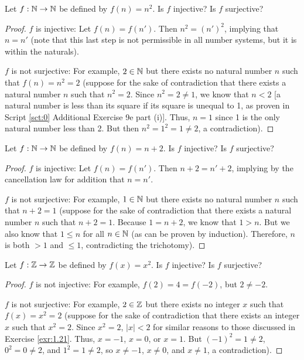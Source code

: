 \documentclass[../main.tex]{subfiles}
\begin{document}
\begin{exercise}\label{exr:1.21}
    Let $f:\mathbb{N}\to\mathbb{N}$ be defined by $f(n)=n^2$. Is $f$ injective? Is $f$ surjective?
    \begin{proof}
        $f$ is injective: Let $f(n)=f(n')$. Then $n^2=(n')^2$, implying that $n=n'$ (note that this last step is not permissible in all number systems, but it is within the naturals).\par
        $f$ is not surjective: For example, $2\in\mathbb{N}$ but there exists no natural number $n$ such that $f(n)=n^2=2$ (suppose for the sake of contradiction that there exists a natural number $n$ such that $n^2=2$. Since $n^2=2\neq 1$, we know that $n<2$ [a natural number is less than its square if its square is unequal to 1, as proven in Script \ref{sct:0} Additional Exercise 9e part (i)]. Thus, $n=1$ since 1 is the only natural number less than 2. But then $n^2=1^2=1\neq 2$, a contradiction).
    \end{proof}
\end{exercise}

\begin{exercise}\label{exr:1.22}
    Let $f:\mathbb{N}\to\mathbb{N}$ be defined by $f(n)=n+2$. Is $f$ injective? Is $f$ surjective?
    \begin{proof}
        $f$ is injective: Let $f(n)=f(n')$. Then $n+2=n'+2$, implying by the cancellation law for addition that $n=n'$.\par
        $f$ is not surjective: For example, $1\in\mathbb{N}$ but there exists no natural number $n$ such that $n+2=1$ (suppose for the sake of contradiction that there exists a natural number $n$ such that $n+2=1$. Because $1=n+2$, we know that $1>n$. But we also know that $1\leq n$ for all $n\in\mathbb{N}$ (as can be proven by induction). Therefore, $n$ is both $>1$ and $\leq 1$, contradicting the trichotomy).
    \end{proof}
\end{exercise}

\begin{exercise}\label{exr:1.23}
    Let $f:\mathbb{Z}\to\mathbb{Z}$ be defined by $f(x)=x^2$. Is $f$ injective? Is $f$ surjective?
    \begin{proof}
        $f$ is not injective: For example, $f(2)=4=f(-2)$, but $2\neq -2$.\par
        $f$ is not surjective: For example, $2\in\mathbb{Z}$ but there exists no integer $x$ such that $f(x)=x^2=2$ (suppose for the sake of contradiction that there exists an integer $x$ such that $x^2=2$. Since $x^2=2$, $|x|<2$ for similar reasons to those discussed in Exercise \ref{exr:1.21}. Thus, $x=-1$, $x=0$, or $x=1$. But $(-1)^2=1\neq 2$, $0^2=0\neq 2$, and $1^2=1\neq 2$, so $x\neq -1$, $x\neq 0$, and $x\neq 1$, a contradiction).
    \end{proof}
\end{exercise}
\end{document}
